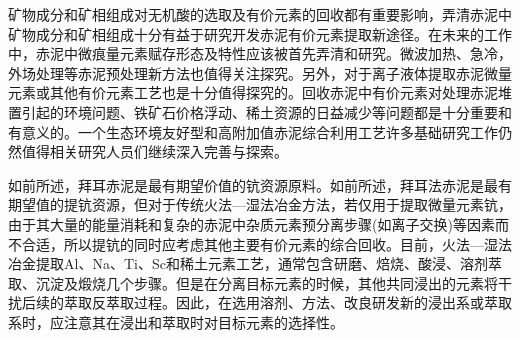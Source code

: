 矿物成分和矿相组成对无机酸的选取及有价元素的回收都有重要影响，弄清赤泥中矿物成分和矿相组成十分有益于研究开发赤泥有价元素提取新途径。在未来的工作中，赤泥中微痕量元素赋存形态及特性应该被首先弄清和研究。微波加热、急冷，外场处理等赤泥预处理新方法也值得关注探究。另外，对于离子液体提取赤泥微量元素或其他有价元素工艺也是十分值得探究的。回收赤泥中有价元素对处理赤泥堆置引起的环境问题、铁矿石价格浮动、稀土资源的日益减少等问题都是十分重要和有意义的。一个生态环境友好型和高附加值赤泥综合利用工艺许多基础研究工作仍然值得相关研究人员们继续深入完善与探索。

如前所述，拜耳赤泥是最有期望价值的钪资源原料。如前所述，拜耳法赤泥是最有期望值的提钪资源，但对于传统火法—湿法冶金方法，若仅用于提取微量元素钪，由于其大量的能量消耗和复杂的赤泥中杂质元素预分离步骤(如离子交换)等因素而不合适，所以提钪的同时应考虑其他主要有价元素的综合回收。目前，火法—湿法冶金提取Al、Na、Ti、Sc和稀土元素工艺，通常包含研磨、焙烧、酸浸、溶剂萃取、沉淀及煅烧几个步骤。但是在分离目标元素的时候，其他共同浸出的元素将干扰后续的萃取反萃取过程。因此，在选用溶剂、方法、改良研发新的浸出系或萃取系时，应注意其在浸出和萃取时对目标元素的选择性。


